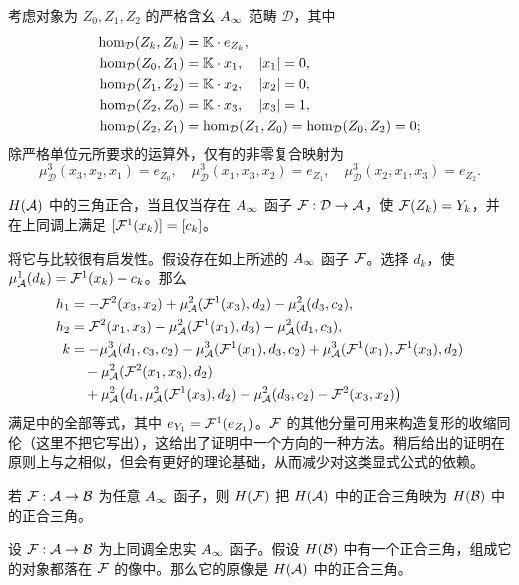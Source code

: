 考虑对象为 $Z_0,Z_1,Z_2$ 的严格含幺 $A_\infty$ 范畴 $\mathcal D$，其中
\[
\begin{aligned}
\hom_{\mathcal D}(Z_k,Z_k)&=\mathbb K\cdot e_{Z_k},\\
\hom_{\mathcal D}(Z_0,Z_1)&=\mathbb K\cdot x_1,\quad |x_1|=0,\\
\hom_{\mathcal D}(Z_1,Z_2)&=\mathbb K\cdot x_2,\quad |x_2|=0,\\
\hom_{\mathcal D}(Z_2,Z_0)&=\mathbb K\cdot x_3,\quad |x_3|=1,\\
\hom_{\mathcal D}(Z_2,Z_1)&=\hom_{\mathcal D}(Z_1,Z_0)=\hom_{\mathcal D}(Z_0,Z_2)=0;
\end{aligned}
\]
除严格单位元所要求的运算外，仅有的非零复合映射为
\[
\mu^3_{\mathcal D}(x_3,x_2,x_1)=e_{Z_0},\quad
\mu^3_{\mathcal D}(x_1,x_3,x_2)=e_{Z_1},\quad
\mu^3_{\mathcal D}(x_2,x_1,x_3)=e_{Z_2}.
\]
\begin{proposition}\label{st:3.8}
$H(\mathcal A)$ 中的三角正合，当且仅当存在 $A_\infty$ 函子 $\mathcal F:\mathcal D\to\mathcal A$，使 $\mathcal F(Z_k)=Y_k$，并在上同调上满足 $[\mathcal F^1(x_k)]=[c_k]$。
\end{proposition}
将它与比较很有启发性。假设存在如上所述的 $A_\infty$ 函子 $\mathcal F$。选择 $d_k$，使 $\mu^1_{\mathcal A}(d_k)=\mathcal F^1(x_k)-c_k$。那么
\begin{equation}\label{eq:3.12}
\begin{aligned}
h_1&=-\mathcal F^2(x_3,x_2)+\mu^2_{\mathcal A}(\mathcal F^1(x_3),d_2)-\mu^2_{\mathcal A}(d_3,c_2),\\
h_2&=\mathcal F^2(x_1,x_3)-\mu^2_{\mathcal A}(\mathcal F^1(x_1),d_3)-\mu^2_{\mathcal A}(d_1,c_3),\\
k&=-\mu^3_{\mathcal A}(d_1,c_3,c_2)-\mu^3_{\mathcal A}(\mathcal F^1(x_1),d_3,c_2)+\mu^3_{\mathcal A}(\mathcal F^1(x_1),\mathcal F^1(x_3),d_2)\\
&\quad-\mu^2_{\mathcal A}(\mathcal F^2(x_1,x_3),d_2)\\
&\quad+\mu^2_{\mathcal A}\bigl(d_1,\mu^2_{\mathcal A}(\mathcal F^1(x_3),d_2)-\mu^2_{\mathcal A}(d_3,c_2)-\mathcal F^2(x_3,x_2)\bigr)
\end{aligned}
\end{equation}
满足中的全部等式，其中 $e_{Y_1}=\mathcal F^1(e_{Z_1})$。$\mathcal F$ 的其他分量可用来构造复形的收缩同伦（这里不把它写出），这给出了证明中一个方向的一种方法。稍后给出的证明在原则上与之相似，但会有更好的理论基础，从而减少对这类显式公式的依赖。
\begin{corollary}\label{st:3.9}
若 $\mathcal F:\mathcal A\to\mathcal B$ 为任意 $A_\infty$ 函子，则 $H(\mathcal F)$ 把 $H(\mathcal A)$ 中的正合三角映为 $H(\mathcal B)$ 中的正合三角。
\end{corollary}
\begin{corollary}\label{st:3.10}
设 $\mathcal F:\mathcal A\to\mathcal B$ 为上同调全忠实 $A_\infty$ 函子。假设 $H(\mathcal B)$ 中有一个正合三角，组成它的对象都落在 $\mathcal F$ 的像中。那么它的原像是 $H(\mathcal A)$ 中的正合三角。
\end{corollary}

